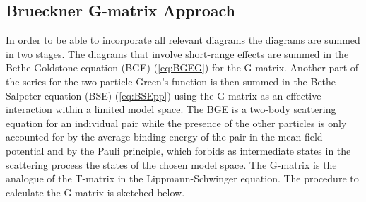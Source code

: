 \subsection{Brueckner G-matrix Approach}
In order to be able to incorporate all relevant diagrams the diagrams are
summed in two stages. The diagrams that involve short-range effects are summed 
in the Bethe-Goldstone equation (BGE) (\ref{eq:BGEG}) for the G-matrix. Another
part of the 
series for the two-particle Green's function  is then summed in the 
Bethe-Salpeter equation (BSE) (\ref{eq:BSEpp}) using the G-matrix as an 
effective 
interaction within a limited model space. The BGE is a two-body scattering 
equation for an individual pair while the presence of the other particles is 
only accounted for by the average binding energy of the pair in the mean field
potential and by the Pauli principle, which forbids as intermediate states in 
the scattering process the 
states of the chosen model space.
The G-matrix is the analogue of the T-matrix in the  Lippmann-Schwinger
equation. The procedure to calculate the G-matrix is sketched below.

